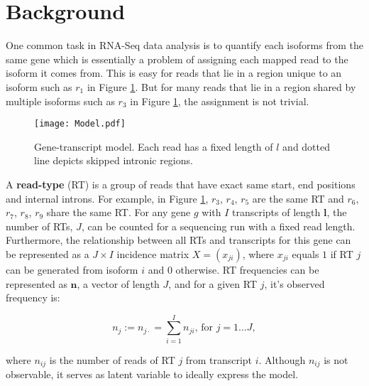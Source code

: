 \documentclass[11pt]{article}
\begin{document}
\section{Background}
\label{background}

One common task in RNA-Seq data analysis is to quantify each isoforms from the same gene which is essentially a problem of assigning each mapped read to the isoform it comes from.  This is easy for reads that lie in a region unique to an isoform such as $r_1$ in Figure \ref{model}.  But for many reads that lie in a region shared by multiple isoforms such as $r_3$ in Figure \ref{model}, the assignment is not trivial. 

\begin{figure}[H]
\centering
\texttt{[image: Model.pdf]}
\caption{Gene-transcript model. Each read has a fixed length of $l$ and dotted line depicts skipped intronic regions.}
\label{model}
\end{figure}

A \textbf{read-type} (RT) is a group of reads that have exact same start, end positions and internal introns.  For example, in Figure \ref{model}, $r_3$, $r_4$, $r_5$ are the same RT and $r_6$, $r_7$, $r_8$, $r_9$ share the same RT.  For any gene $g$ with $I$ transcripts of length $\mathbf{l}$, the number of RTs, $J$, can be counted for a sequencing run with a fixed read length.  Furthermore, the relationship between all RTs and transcripts for this gene can be represented as a $J \times I$ incidence matrix $X=(x_{ji})$, where $x_{ji}$ equals $1$ if RT $j$ can be generated from isoform $i$ and $0$ otherwise.  RT frequencies can be represented as $\mathbf{n}$, a vector of length $J$, and for a given RT $j$, it’s observed frequency is:

\[n_j:=n_{j\cdot}=\sum_{i=1}^{I}n_{ji}\text{, for }j=1\ldots J,\]
  
\noindent where $n_{ij}$ is the number of reads of RT $j$ from transcript $i$. Although $n_{ij}$ is not observable, it serves as latent variable to ideally express the model.\\ 
\end{document}
